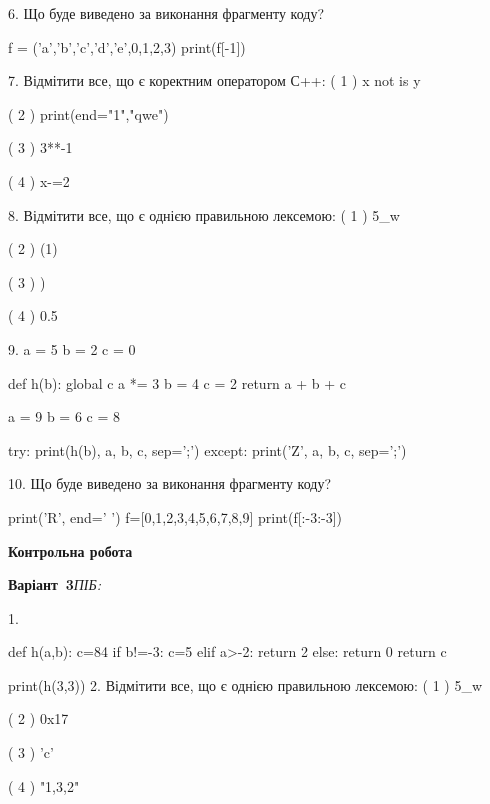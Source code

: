 \documentclass[11pt]{article}
\begin{document}
6. Що буде виведено за виконання фрагменту коду?

f = ('a','b','c','d','e',0,1,2,3)
print(f[-1])


7. %
Відмітити все, що є коректним оператором С++:
( 1 ) x not is y

( 2 ) print(end="1","qwe")

( 3 ) 3**-1

( 4 ) x-=2

8. %
Відмітити все, що є однією правильною лексемою:
( 1 ) 5_w

( 2 ) (1)

( 3 ) )

( 4 ) 0.5

9. 
a = 5
b = 2
c = 0

def h(b):
global c    a *= 3
    b = 4
    c = 2
    return a + b + c

a = 9
b = 6
c = 8

try:
    print(h(b), a, b, c, sep=';')
except:
    print('Z', a, b, c, sep=';')

10. Що буде виведено за виконання фрагменту коду?

print('R', end=' ')
f=[0,1,2,3,4,5,6,7,8,9]
print(f[:-3:-3])












\newpage

\newpage

{\large\textbf{Контрольна робота}}

\textbf{Варіант \No\,3}\hfill \textit{ПІБ:}\,\underline{\hspace{60mm}}
\vspace{4mm}

1. 

def h(a,b):
    c=84
    if b!=-3:
        c=5
    elif a>-2:
         return 2
    else: 
        return 0
    return c

print(h(3,3))
2. %
Відмітити все, що є однією правильною лексемою:
( 1 ) 5_w

( 2 ) 0x17

( 3 ) 'c'

( 4 ) "1,3,2"
\end{document}

